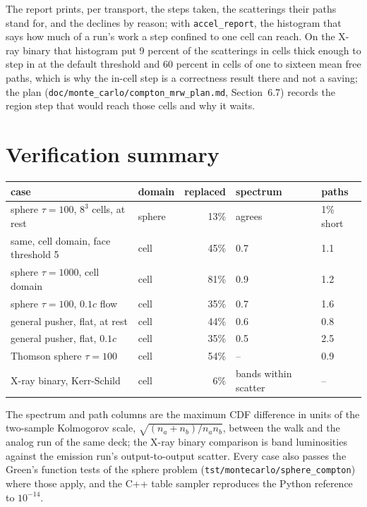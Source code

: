 \documentclass[11pt]{article}
\newcommand{\key}[1]{\texttt{#1}}
\begin{document}
The report prints, per transport, the steps taken, the scatterings their paths stand
for, and the declines by reason; with \key{accel\_report}, the histogram that says how
much of a run's work a step confined to one cell can reach.  On the X-ray binary that
histogram put 9 percent of the scatterings in cells thick enough to step in at the
default threshold and 60 percent in cells of one to sixteen mean free paths, which is
why the in-cell step is a correctness result there and not a saving; the plan
(\texttt{doc/monte\_carlo/compton\_mrw\_plan.md}, Section~6.7) records the region step
that would reach those cells and why it waits.

\section{Verification summary}

\begin{center}
\small
\begin{tabular}{llrll}
\toprule
case & domain & replaced & spectrum & paths \\
\midrule
sphere $\tau=100$, $8^3$ cells, at rest & sphere & 13\% & agrees & 1\% short \\
same, cell domain, face threshold 5 & cell & 45\% & 0.7 & 1.1 \\
sphere $\tau=1000$, cell domain & cell & 81\% & 0.9 & 1.2 \\
sphere $\tau=100$, $0.1c$ flow & cell & 35\% & 0.7 & 1.6 \\
general pusher, flat, at rest & cell & 44\% & 0.6 & 0.8 \\
general pusher, flat, $0.1c$ & cell & 35\% & 0.5 & 2.5 \\
Thomson sphere $\tau=100$ & cell & 54\% & -- & 0.9 \\
X-ray binary, Kerr-Schild & cell & 6\% & bands within scatter & -- \\
\bottomrule
\end{tabular}
\end{center}
The spectrum and path columns are the maximum CDF difference in units of the two-sample
Kolmogorov scale, $\sqrt{(n_a+n_b)/n_an_b}$, between the walk and the analog run of the
same deck; the X-ray binary comparison is band luminosities against the emission run's
output-to-output scatter.  Every case also passes the Green's function tests of the
sphere problem (\texttt{tst/montecarlo/sphere\_compton}) where those apply, and the C++
table sampler reproduces the Python reference to $10^{-14}$.
\end{document}
